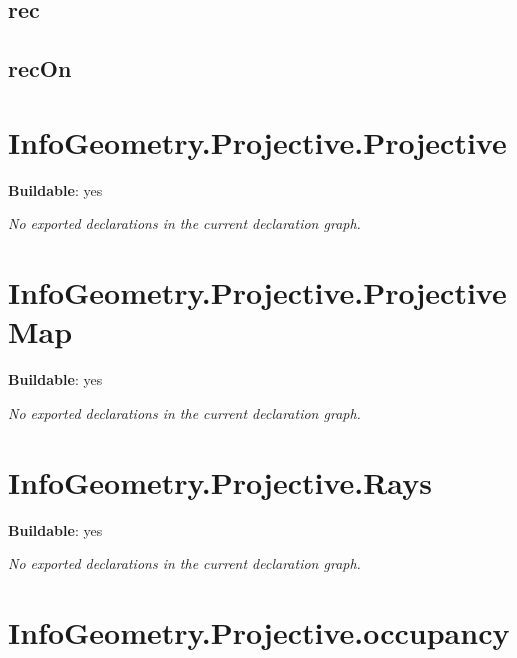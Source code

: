 \begin{theorem}[blueprint="infogeometry:projective:physicalkinematics:ray_gauge"]
\end{theorem}

\subsection*{rec}

\begin{theorem}[blueprint="infogeometry:projective:physicalkinematics:rec"]
\end{theorem}

\subsection*{recOn}

\begin{theorem}[blueprint="infogeometry:projective:physicalkinematics:recon"]
\end{theorem}

\section{InfoGeometry.Projective.Projective}

\noindent\textbf{Buildable}: yes

\noindent\emph{No exported declarations in the current declaration graph.}

\section{InfoGeometry.Projective.ProjectiveMap}

\noindent\textbf{Buildable}: yes

\noindent\emph{No exported declarations in the current declaration graph.}

\section{InfoGeometry.Projective.Rays}

\noindent\textbf{Buildable}: yes

\noindent\emph{No exported declarations in the current declaration graph.}

\section{InfoGeometry.Projective.occupancy}


